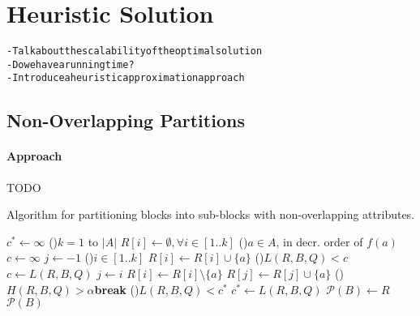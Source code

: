 \section{Heuristic Solution}\label{sec:heuristic}


\begin{alltt}
- Talk about the scalability of the optimal solution
- Do we have a running time?
- Introduce a heuristic approximation approach
\end{alltt}

\subsection{Non-Overlapping Partitions}\label{subsec:nov-heuristic}
\noindent


\paragraph*{Approach$\,$}
TODO

\begin{algorithm}[ht]
\scriptsize
\caption{Algorithm for partitioning blocks into sub-blocks with non-overlapping attributes.}
\label{alg:non-overlappingP}
$c^*\leftarrow \infty$ 
\For(){$k=1$ to $|A|$}{
   $R[i]\leftarrow \emptyset, \forall i\in [1..k]$ 
   \For(){$a \in A$\textnormal{, in decr.\/ order of }$f(a)$}{
      $c\leftarrow \infty$   
      $j\leftarrow -1$ 
      \For(){$i\in [1..k]$} {
         $R[i]\leftarrow R[i] \cup \{a\}$
         \If(){$L(R, B, Q)<c$}{
            $c\leftarrow L(R, B, Q)$
            $j\leftarrow i$
         }
         $R[i]\leftarrow R[i] \setminus \{a\}$
      }
      $R[j]\leftarrow R[j] \cup \{a\}$
   }
   \lIf(){$H(R, B, Q)>\alpha$}{\textbf{break}}
   \If(){$L(R, B, Q)<c^*$}{
     $c^* \leftarrow L(R, B, Q)$
     $\mathcal{P}(B)\leftarrow R$
   } 
}
\Return $\mathcal{P}(B)$ 
\end{algorithm} 


